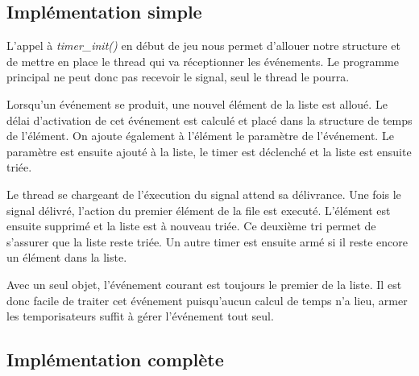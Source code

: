 \documentclass[10pt,a4paper]{article}
\begin{document}
\subsection{Implémentation simple}

	L'appel à \textit{timer\_init()} en début de jeu nous permet d'allouer notre structure et de mettre en place le thread qui va réceptionner les événements. Le programme principal ne peut donc pas recevoir le signal, seul le thread le pourra. 
	
	Lorsqu'un événement se produit, une nouvel élément de la liste est alloué. Le délai d'activation de cet événement est calculé et placé dans la structure de temps de l'élément. On ajoute également à l'élément le paramètre de l'événement. Le paramètre est ensuite ajouté à la liste, le timer est déclenché et la liste est ensuite triée.
	
	Le thread se chargeant de l'éxecution du signal attend sa délivrance. Une fois le signal délivré, l'action du premier élément de la file est executé. L'élément est ensuite supprimé et la liste est à nouveau triée. Ce deuxième tri permet de s'assurer que la liste reste triée. Un autre timer est ensuite armé si il reste encore un élément dans la liste.
	
	Avec un seul objet, l'événement courant est toujours le premier de la liste. Il est donc facile de traiter cet événement puisqu'aucun calcul de temps n'a lieu, armer les temporisateurs suffit à gérer l'événement tout seul.
	
	\subsection{Implémentation complète} 
\end{document}
